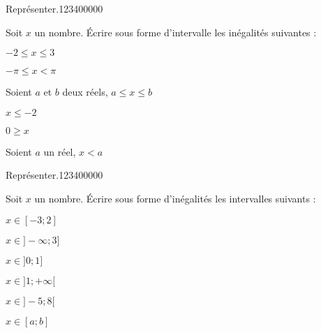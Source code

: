 \begin{pageAD}  %
\restoregeometry %

 

  
\begin{ExoCad}{Représenter.}{1234}{0}{0}{0}{0}{0}

Soit $x$ un nombre. Écrire sous forme d'intervalle les inégalités suivantes :


\begin{enumerate}[leftmargin=*]
\begin{minipage}{0.49\linewidth}
	\item $-2 \leq x \leq 3$  
	\item $-\pi \leq x <  \pi$  
	\item Soient $a$ et $b$ deux réels, $a \leq x \leq  b$  
\end{minipage}
\hfill
\begin{minipage}{0.49\linewidth}
	\item $ x \leq -2$  
	\item $0 \geq x $  
	\item Soient $a$ un réel, $x <  a$  
\end{minipage}
\end{enumerate} 
\end{ExoCad}

  
\begin{ExoCad}{Représenter.}{1234}{0}{0}{0}{0}{0}

Soit $x$ un nombre. Écrire sous forme d'inégalités  les  intervalles suivants :

\begin{enumerate}[leftmargin=*]
\begin{minipage}{0.3\linewidth}
	\item $x \in [-3;2]$  
	\item $x \in ]-\infty;3]$  
\end{minipage}
\hfill
\begin{minipage}{0.3\linewidth}
	\item $x \in ]0;1]$  
	\item $x \in ]1;+\infty[$  
\end{minipage}
\hfill
\begin{minipage}{0.3\linewidth}
	\item $x \in ]-5;8[$  
	\item $x \in [a;b]$  
\end{minipage}
\end{enumerate} 
\end{ExoCad}




\end{pageAD}
